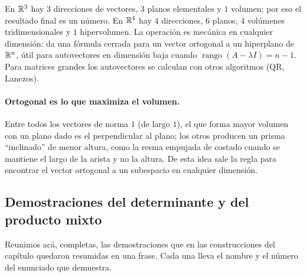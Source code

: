 \begin{idea}
En \(\mathbb{R}^3\) hay \(3\) direcciones de vectores, \(3\) planos elementales y \(1\) volumen; por
eso el resultado final es un número. En \(\mathbb{R}^4\) hay \(4\) direcciones, \(6\) planos, \(4\)
volúmenes tridimensionales y \(1\) hipervolumen. La operación es mecánica en cualquier
dimensión: da una fórmula cerrada para un vector ortogonal a un hiperplano de \(\mathbb{R}^n\), útil
para autovectores en dimensión baja cuando \(\operatorname{rango}(A-\lambda I)=n-1\). Para
matrices grandes los autovectores se calculan con otros algoritmos (QR, Lanczos).
\end{idea}

\paragraph{Ortogonal es lo que maximiza el volumen.} Entre todos los vectores de norma
\(1\) (de largo \(1\)), el que forma mayor volumen con un plano dado es el perpendicular al
plano; los otros producen un prisma \enquote{inclinado} de menor altura, como la resma
empujada de costado cuando se mantiene el largo de la arista y no la altura. De esta idea sale
la regla para encontrar el vector ortogonal a un subespacio en cualquier dimensión.

\subsection{Demostraciones del determinante y del producto mixto}\label{sec:demos-determinante}

Reunimos acá, completas, las demostraciones que en las construcciones del capítulo quedaron
resumidas en una frase. Cada una lleva el nombre y el número del enunciado que demuestra.

